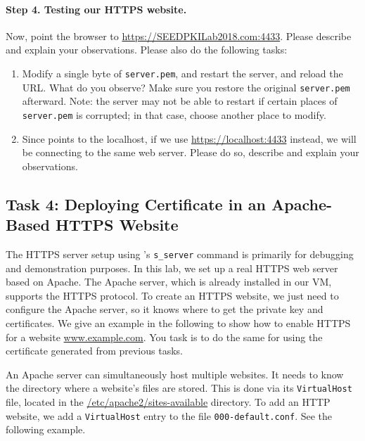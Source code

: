 \paragraph{Step 4. Testing our HTTPS website.}
Now, point the browser to \url{https://SEEDPKILab2018.com:4433}. Please 
describe and explain your observations. Please also do the following
tasks:

\begin{enumerate}
\item Modify a single byte of {\tt server.pem}, and restart the 
      server, and reload the URL. 
      What do you observe? Make sure you restore the 
      original {\tt server.pem} afterward. Note:
      the server may not be able to restart if certain places of
      {\tt server.pem} is corrupted; in that case, choose 
      another place to modify.
      

\item Since \pkiserver points to the localhost, if we
      use \url{https://localhost:4433} instead, we will be connecting to the 
      same web server. Please do so, describe and explain your observations. 
\end{enumerate}



\subsection{Task 4: Deploying Certificate in an Apache-Based HTTPS Website}


The HTTPS server setup using \openssl's \texttt{s\_server} command is primarily for debugging and
demonstration purposes. In this lab, we set up a real HTTPS web server based
on Apache. The Apache server, which is already installed in our VM, supports 
the HTTPS protocol. To create an HTTPS website, we just need to 
configure the Apache server, so it knows where to get the private key and certificates. 
We give an example in the following to show how to enable HTTPS for a website \url{www.example.com}.
You task is to do the same for \pkiserver using the certificate
generated from previous tasks. 

An Apache server can simultaneously host multiple websites. It needs to know
the directory where a website's files are stored. This is done via its 
\texttt{VirtualHost} file, located in the \url{/etc/apache2/sites-available}
directory. To add an HTTP website, we add a \texttt{VirtualHost} entry
to the file \texttt{000-default.conf}. See the following example. 

